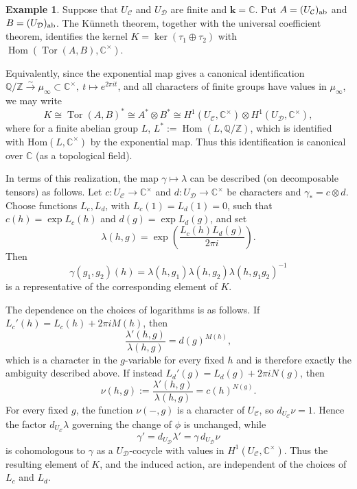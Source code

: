 \documentclass[12pt]{amsart}
\numberwithin{equation}{section}
\theoremstyle{definition}
\newtheorem{example}[theorem]{Example}
\newcommand{\Hom}{\text{Hom}}
\newcommand{\1}{_{(1)}}
\newcommand{\2}{_{(2)}}
\newcommand{\3}{_{(3)}}
\newcommand{\4}{_{(4)}}
\newcommand{\5}{_{(5)}}
\newcommand{\6}{_{(6)}}
\newcommand{\C}{\mathcal{C}}
\theoremstyle{plain}
\theoremstyle{definition}
\theoremstyle{remark}
\def\C{\mathcal{C}}
\def\D{\mathcal{D}}
\def\Hom{\mathrm{Hom}}
\def\k{\mathbf{k}}
\begin{document}
\begin{example} Suppose that $U_{\mathcal C}$ and $U_{\mathcal D}$ are finite and $\k=\mathbb C$.
Put $A=(U_{\mathcal C})_{\rm ab}$ and $B=(U_{\mathcal D})_{\rm ab}$.
The K\"unneth theorem, together with the universal coefficient theorem, identifies the kernel
$K=\ker(\tau_1\oplus \tau_2)$
with
$\operatorname{Hom}(\operatorname{Tor}(A,B),\mathbb C^\times)$.

Equivalently, since the exponential map gives a canonical identification
$\mathbb Q/\mathbb Z \xrightarrow{\sim} \mu_\infty\subset \mathbb C^\times,
\ t\mapsto e^{2\pi i t}$,
and all characters of finite groups have values in $\mu_\infty$, we may write
\[
K\cong \operatorname{Tor}(A,B)^*
\cong A^*\otimes B^*
\cong H^1(U_{\mathcal C},\mathbb C^\times)\otimes H^1(U_{\mathcal D},\mathbb C^\times),
\]
where for a finite abelian group $L$, $L^*:=\operatorname{Hom}(L,\mathbb Q/\mathbb Z)$, which is 
identified with $\Hom(L,\mathbb C^\times)$ by the exponential map. Thus this identification is canonical over $\mathbb C$ (as a topological field).

In terms of this realization, the map $\gamma\mapsto\lambda$ can be described (on decomposable tensors) as follows. 
Let \(c:U_\C\to\mathbb C^\times\) and \(d:U_\D\to\mathbb C^\times\) be characters and $\gamma_*=c\otimes d$.
  Choose functions \(L_c,L_d\), with \(L_c(1)=L_d(1)=0\), such that \(c(h)=\exp L_c(h)\) and \(d(g)=\exp L_d(g)\), and set
\[
        \lambda(h,g)=\exp\!\left(\frac{L_c(h)L_d(g)}{2\pi i}\right).
\]
Then
\[
        \gamma(g_1,g_2)(h)=
        \lambda(h,g_1)\lambda(h,g_2)\lambda(h,g_1g_2)^{-1}
\]
is a representative of the corresponding element of \(K\).  

The dependence on the choices of logarithms is as follows. If
$L_c'(h)=L_c(h)+2\pi iM(h)$, then
\[
        \frac{\lambda'(h,g)}{\lambda(h,g)}=d(g)^{M(h)},
\]
which is a character in the $g$-variable for every fixed $h$ and is
therefore exactly the ambiguity described above. If instead
$L_d'(g)=L_d(g)+2\pi iN(g)$, then
\[
        \nu(h,g):=\frac{\lambda'(h,g)}{\lambda(h,g)}=c(h)^{N(g)}.
\]
For every fixed $g$, the function $\nu(-,g)$ is a character of
$U_\C$, so $d_{U_\C}\nu=1$. Hence the factor
$d_{U_\C}\lambda$ governing the change of $\phi$ is unchanged, while
\[
        \gamma'=d_{U_\D}\lambda'
        =\gamma\,d_{U_\D}\nu
\]
is cohomologous to $\gamma$ as a $U_\D$-cocycle with values in
$H^1(U_\C,\mathbb C^\times)$. Thus the resulting element of $K$, and
the induced action, are independent of the choices of $L_c$ and $L_d$.
\end{example}
\end{document}
